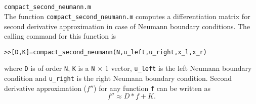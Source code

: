 \documentclass[acmtoms]{acmtrans2m}
\begin{document}
\section{} \verb#compact_second_neumann.m#\\
 The function \verb#compact_second_neumann.m# computes a differentiation matrix for second derivative approximation in case of Neumann boundary conditions. The calling command for this function is
\begin{alltt}
>>[D,K]=compact_second_neumann(N,u_left,u_right,x_l,x_r)
\end{alltt}
where \verb#D# is of order \verb#N#, \verb#K# is a \verb#N# $\times$ $1$ vector, \verb#u_left# is the left Neumann boundary condition and \verb#u_right# is the right Neumann boundary condition. Second derivative approximation ($f''$) for any function \verb#f# can be written as
\[
f''\approx D*f+K.
\]
\end{document}
